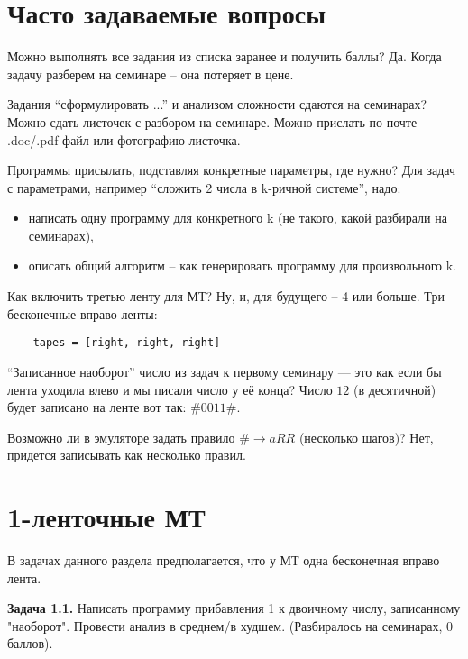 \documentclass[a4paper, 10pt]{extarticle}
\title{}
\author{Филатов А. Ю.}
\date{}
\newcommand{\Task}[1]{\textbf{Задача #1.}}
\newenvironment{faq}{\begin{description}[style=nextline]}{\end{description}}
\begin{document}
\section*{Часто задаваемые вопросы}

\begin{faq}
  \item[Можно выполнять все задания из списка заранее и получить баллы?]
    Да. Когда задачу разберем на семинаре -- она потеряет в цене.
  \item[Задания ``сформулировать ...'' и анализом сложности сдаются на семинарах?]
    Можно сдать листочек с разбором на семинаре. Можно прислать по почте .doc/.pdf файл или фотографию листочка.
  \item[Программы присылать, подставляя конкретные параметры, где нужно?]
    Для задач с параметрами, например ``сложить 2 числа в k-ричной системе'', надо: 
    \begin{itemize}
     \item написать одну программу для конкретного k (не такого, какой разбирали на семинарах),
     \item описать общий алгоритм -- как генерировать программу для произвольного k.  
    \end{itemize}

    \item[Как включить третью ленту для МТ? Ну, и, для будущего -- 4 или больше.]    
    Три бесконечные вправо ленты:
\begin{verbatim}
    tapes = [right, right, right]
\end{verbatim}

    \item[``Записанное наоборот'' число из задач к первому семинару — это как если бы лента уходила влево и мы писали число у её конца?]
    Число $12$ (в десятичной) будет записано на ленте вот так: $\#0011\#$.
    
    \item[Возможно ли в эмуляторе задать правило $\# \rightarrow aRR$ (несколько шагов)?]
    Нет, придется записывать как несколько правил.
\end{faq}
\newpage

\section{1-ленточные МТ}
В задачах данного раздела предполагается, что у МТ одна бесконечная вправо лента.

\Task{1.1} Написать программу прибавления 1 к двоичному числу, записанному "наоборот".
Провести анализ в среднем/в худшем. (Разбиралось на семинарах, 0 баллов).
\end{document}
